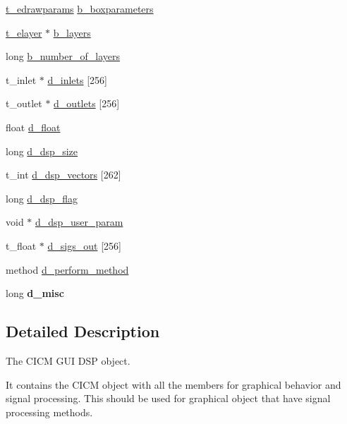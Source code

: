 \begin{DoxyCompactItemize}
\item 
\hyperlink{struct__edrawparams}{t\-\_\-edrawparams} \hyperlink{struct__edspbox_a01fa53a36dc717c81755d805a868ad9d}{b\-\_\-boxparameters}
\item 
\hyperlink{struct__elayer}{t\-\_\-elayer} $\ast$ \hyperlink{struct__edspbox_ad80949f483467d74761a9e321300d64e}{b\-\_\-layers}
\item 
long \hyperlink{struct__edspbox_a84105957ca11a224cf734f350fb23ac9}{b\-\_\-number\-\_\-of\-\_\-layers}
\item 
t\-\_\-inlet $\ast$ \hyperlink{struct__edspbox_af58ea0594fc028861443f36dc2d1ebf4}{d\-\_\-inlets} \mbox{[}256\mbox{]}
\item 
t\-\_\-outlet $\ast$ \hyperlink{struct__edspbox_a529a1e3597eb3ee79f6cabef51f41ef9}{d\-\_\-outlets} \mbox{[}256\mbox{]}
\item 
float \hyperlink{struct__edspbox_aaa8c8ad1277112523fd01b5058e0fcb5}{d\-\_\-float}
\item 
long \hyperlink{struct__edspbox_a0bb016ebe02ce3d3a0965a19c1d8476d}{d\-\_\-dsp\-\_\-size}
\item 
t\-\_\-int \hyperlink{struct__edspbox_a6c9361ef0820022b61cd7894d641c029}{d\-\_\-dsp\-\_\-vectors} \mbox{[}262\mbox{]}
\item 
long \hyperlink{struct__edspbox_af3409f354253e5753dbba6b22472972e}{d\-\_\-dsp\-\_\-flag}
\item 
void $\ast$ \hyperlink{struct__edspbox_ab056760f93f95b4edc3a8dddd0b5b62f}{d\-\_\-dsp\-\_\-user\-\_\-param}
\item 
t\-\_\-float $\ast$ \hyperlink{struct__edspbox_aebb3e36050cca90ec2bbfc8226198ca8}{d\-\_\-sigs\-\_\-out} \mbox{[}256\mbox{]}
\item 
method \hyperlink{struct__edspbox_ae13acca7c0f073f1030545ce368e6e03}{d\-\_\-perform\-\_\-method}
\item 
\hypertarget{struct__edspbox_a4c692fd24facbf12d763b7f8d813c266}{long {\bfseries d\-\_\-misc}}\label{struct__edspbox_a4c692fd24facbf12d763b7f8d813c266}

\end{DoxyCompactItemize}


\subsection{Detailed Description}
The C\-I\-C\-M G\-U\-I D\-S\-P object. 

It contains the C\-I\-C\-M object with all the members for graphical behavior and signal processing. This should be used for graphical object that have signal processing methods. 


